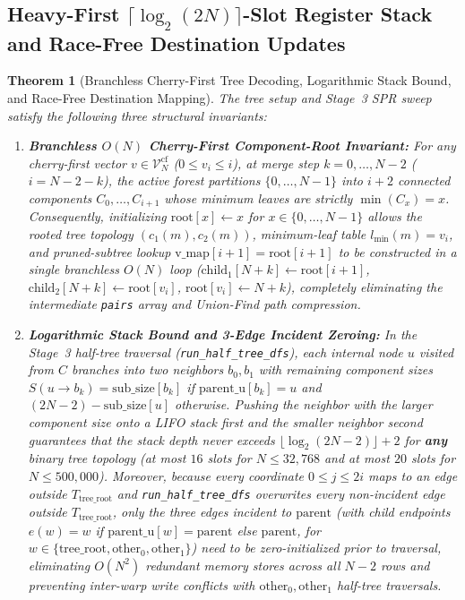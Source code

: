 \documentclass[11pt,a4paper]{article}
\newtheorem{theorem}{Theorem}[section]
\theoremstyle{definition}
\begin{document}
\subsection{Heavy-First $\lceil \log_2(2N) \rceil$-Slot Register Stack and Race-Free Destination Updates}

\begin{theorem}[Branchless Cherry-First Tree Decoding, Logarithmic Stack Bound, and Race-Free Destination Mapping]
\label{thm:heavy_stack}
The tree setup and Stage~3 SPR sweep satisfy the following three structural invariants:
\begin{enumerate}
    \item \textbf{Branchless $O(N)$ Cherry-First Component-Root Invariant:} For any cherry-first vector $v \in \mathcal{V}^{\text{cf}}_N$ ($0 \le v_i \le i$), at merge step $k = 0, \dots, N-2$ ($i = N - 2 - k$), the active forest partitions $\{0, \dots, N-1\}$ into $i + 2$ connected components $C_0, \dots, C_{i+1}$ whose minimum leaves are strictly $\min(C_x) = x$. Consequently, initializing $\text{root}[x] \leftarrow x$ for $x \in \{0, \dots, N-1\}$ allows the rooted tree topology $(c_1(m), c_2(m))$, minimum-leaf table $l_{\min}(m) = v_i$, and pruned-subtree lookup $\text{v\_map}[i+1] = \text{root}[i+1]$ to be constructed in a single branchless $O(N)$ loop ($\text{child}_1[N+k] \leftarrow \text{root}[i+1]$, $\text{child}_2[N+k] \leftarrow \text{root}[v_i]$, $\text{root}[v_i] \leftarrow N+k$), completely eliminating the intermediate \texttt{pairs} array and Union-Find path compression.
    \item \textbf{Logarithmic Stack Bound and 3-Edge Incident Zeroing:} In the Stage~3 half-tree traversal (\texttt{run\_half\_tree\_dfs}), each internal node $u$ visited from $C$ branches into two neighbors $b_0, b_1$ with remaining component sizes $S(u \to b_k) = \text{sub\_size}[b_k]$ if $\text{parent\_u}[b_k] = u$ and $(2N-2) - \text{sub\_size}[u]$ otherwise. Pushing the neighbor with the larger component size onto a LIFO stack first and the smaller neighbor second guarantees that the stack depth never exceeds $\lfloor \log_2(2N-2) \rfloor + 2$ for \textbf{any} binary tree topology (at most $16$ slots for $N \le 32{,}768$ and at most $20$ slots for $N \le 500{,}000$). Moreover, because every coordinate $0 \le j \le 2i$ maps to an edge outside $T_{\text{tree\_root}}$ and \texttt{run\_half\_tree\_dfs} overwrites every non-incident edge outside $T_{\text{tree\_root}}$, only the three edges incident to $\text{parent}$ (with child endpoints $e(w) = w$ if $\text{parent\_u}[w] = \text{parent}$ else $\text{parent}$, for $w \in \{\text{tree\_root}, \text{other}_0, \text{other}_1\}$) need to be zero-initialized prior to traversal, eliminating $O(N^2)$ redundant memory stores across all $N-2$ rows and preventing inter-warp write conflicts with $\text{other}_0, \text{other}_1$ half-tree traversals.

\end{enumerate}
\end{theorem}
\end{document}

